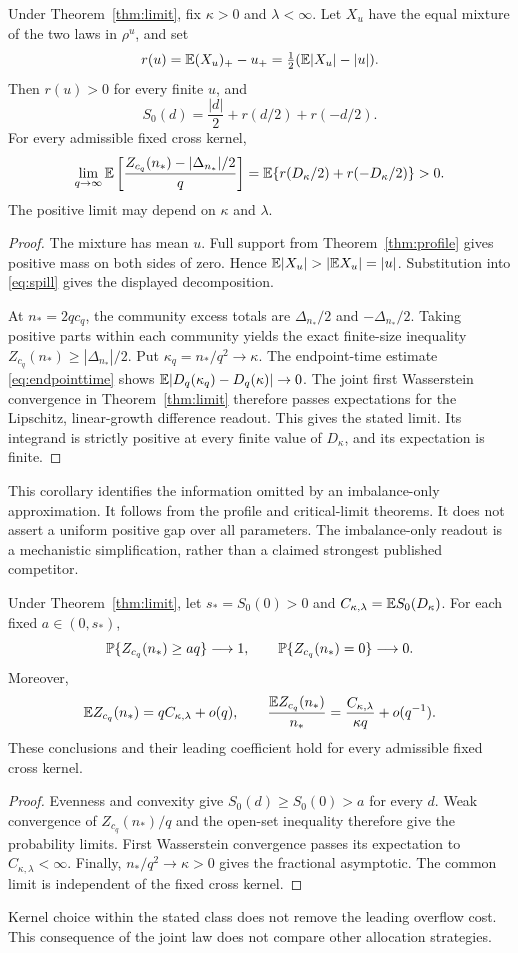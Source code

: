 \begin{corollary}\label{cor:internalexcess}
Under Theorem~\ref{thm:limit}, fix $\kappa>0$ and $\lambda<\infty$. Let $X_u$ have the equal mixture of the two laws in $\rho^u$, and set
\[
 r(u)=\mathbb E(X_u)_+-u_+=\tfrac12(\mathbb E|X_u|-|u|).
\]
Then $r(u)>0$ for every finite $u$, and
\[
 S_0(d)=\frac{|d|}{2}+r(d/2)+r(-d/2).
\]
For every admissible fixed cross kernel,
\[
 \lim_{q\to\infty}\mathbb E\left[\frac{Z_{c_q}(n_*)-|\Delta_{n_*}|/2}{q}\right]
 =\mathbb E\{r(D_\kappa/2)+r(-D_\kappa/2)\}>0.
\]
The positive limit may depend on $\kappa$ and $\lambda$.
\end{corollary}
\begin{proof}
The mixture has mean $u$. Full support from Theorem~\ref{thm:profile} gives positive mass on both sides of zero. Hence $\E|X_u|>|\E X_u|=|u|$. Substitution into \eqref{eq:spill} gives the displayed decomposition.

At $n_*=2qc_q$, the community excess totals are $\Delta_{n_*}/2$ and $-\Delta_{n_*}/2$. Taking positive parts within each community yields the exact finite-size inequality $Z_{c_q}(n_*)\ge|\Delta_{n_*}|/2$. Put $\kappa_q=n_*/q^2\to\kappa$. The endpoint-time estimate \eqref{eq:endpointtime} shows $\mathbb E|D_q(\kappa_q)-D_q(\kappa)|\to0$. The joint first Wasserstein convergence in Theorem~\ref{thm:limit} therefore passes expectations for the Lipschitz, linear-growth difference readout. This gives the stated limit. Its integrand is strictly positive at every finite value of $D_\kappa$, and its expectation is finite.
\end{proof}

This corollary identifies the information omitted by an imbalance-only approximation. It follows from the profile and critical-limit theorems. It does not assert a uniform positive gap over all parameters. The imbalance-only readout is a mechanistic simplification, rather than a claimed strongest published competitor.

\begin{corollary}\label{cor:capacity}
Under Theorem~\ref{thm:limit}, let $s_*=S_0(0)>0$ and
$C_{\kappa,\lambda}=\mathbb E S_0(D_\kappa)$. For each fixed $a\in(0,s_*)$,
\[
 \mathbb P\{Z_{c_q}(n_*)\ge aq\}\longrightarrow1,
 \qquad \mathbb P\{Z_{c_q}(n_*)=0\}\longrightarrow0.
\]
Moreover,
\[
 \mathbb E Z_{c_q}(n_*)=qC_{\kappa,\lambda}+o(q),\qquad
 \frac{\mathbb E Z_{c_q}(n_*)}{n_*}
 =\frac{C_{\kappa,\lambda}}{\kappa q}+o(q^{-1}).
\]
These conclusions and their leading coefficient hold for every admissible
fixed cross kernel.
\end{corollary}
\begin{proof}
Evenness and convexity give $S_0(d)\ge S_0(0)>a$ for every $d$.
Weak convergence of $Z_{c_q}(n_*)/q$ and the open-set inequality therefore give
the probability limits. First Wasserstein convergence passes its expectation
to $C_{\kappa,\lambda}<\infty$. Finally, $n_*/q^2\to\kappa>0$ gives the
fractional asymptotic. The common limit is independent of the fixed cross kernel.
\end{proof}

Kernel choice within the stated class does not remove the leading overflow
cost. This consequence of the joint law does not compare other allocation strategies.
